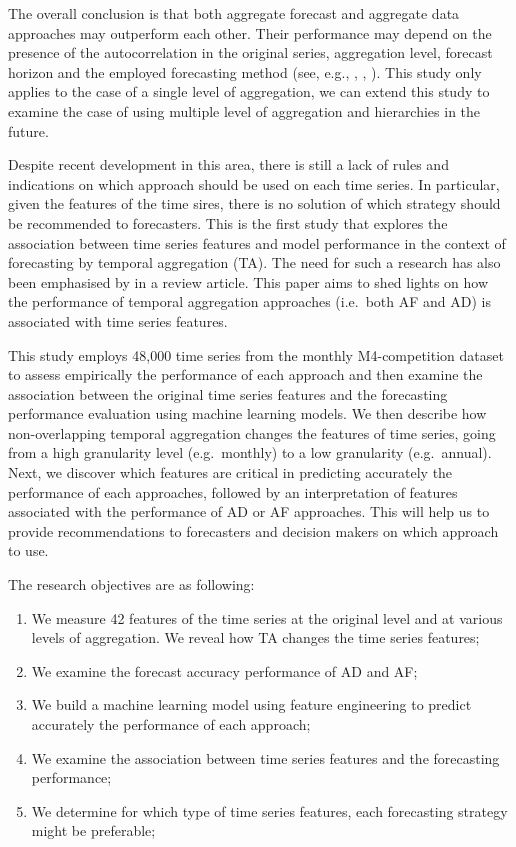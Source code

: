 \documentclass[]{elsarticle} %
\providecommand{\tightlist}{%
  \setlength{\itemsep}{0pt}\setlength{\parskip}{0pt}}
\begin{document}
The overall conclusion is that both aggregate forecast and aggregate
data approaches may outperform each other. Their performance may depend
on the presence of the autocorrelation in the original series,
aggregation level, forecast horizon and the employed forecasting method
(see, e.g., \citet{boylan2016performance}, \citet{rostami2021aggregate},
\citet{rostami2014note} \citet{nikolopoulos2011aggregate}). This study
only applies to the case of a single level of aggregation, we can extend
this study to examine the case of using multiple level of aggregation
and hierarchies in the future.

Despite recent development in this area, there is still a lack of rules
and indications on which approach should be used on each time series. In
particular, given the features of the time sires, there is no solution
of which strategy should be recommended to forecasters. This is the
first study that explores the association between time series features
and model performance in the context of forecasting by temporal
aggregation (TA). The need for such a research has also been emphasised
by \citet{babai2021demand} in a review article. This paper aims to shed
lights on how the performance of temporal aggregation approaches
(i.e.~both AF and AD) is associated with time series features.

This study employs 48,000 time series from the monthly M4-competition
dataset to assess empirically the performance of each approach and then
examine the association between the original time series features and
the forecasting performance evaluation using machine learning models. We
then describe how non-overlapping temporal aggregation changes the
features of time series, going from a high granularity level
(e.g.~monthly) to a low granularity (e.g.~annual). Next, we discover
which features are critical in predicting accurately the performance of
each approaches, followed by an interpretation of features associated
with the performance of AD or AF approaches. This will help us to
provide recommendations to forecasters and decision makers on which
approach to use.

The research objectives are as following:

\begin{enumerate}
\def\labelenumi{\arabic{enumi}.}
\tightlist
\item
  We measure 42 features of the time series at the original level and at
  various levels of aggregation. We reveal how TA changes the time
  series features;
\item
  We examine the forecast accuracy performance of AD and AF;
\item
  We build a machine learning model using feature engineering to predict
  accurately the performance of each approach;
\item
  We examine the association between time series features and the
  forecasting performance;
\item
  We determine for which type of time series features, each forecasting
  strategy might be preferable;
\end{enumerate}
\end{document}
